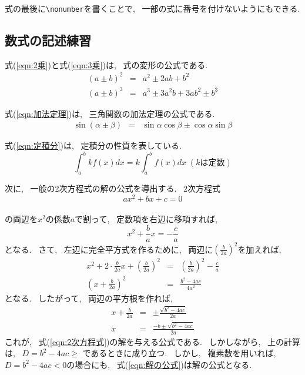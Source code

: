 \documentclass[titlepage]{jarticle}
\begin{document}
			式の最後に\verb|\nonumber|を書くことで, ~一部の式に番号を付けないようにもできる.

	\subsection{数式の記述練習}
		式(\ref{eqn:2乗})と式(\ref{eqn:3乗})は, ~式の変形の公式である.
		\begin{eqnarray}
			(a \pm b)^2 &=& a^2 \pm 2ab + b^2 \label{eqn:2乗} \\
			(a \pm b)^3 &=& a^3 \pm 3a^2b + 3ab^2 \pm b^3 \label{eqn:3乗}
		\end{eqnarray}

		式(\ref{eqn:加法定理})は, ~三角関数の加法定理の公式である.
		\begin{eqnarray}
			\sin(\alpha \pm \beta) &=& \sin{\alpha}\cos{\beta} \pm \cos{\alpha}\sin{\beta}\label{eqn:加法定理}
		\end{eqnarray}

		式(\ref{eqn:定積分})は, ~定積分の性質を表している.
		\begin{equation}
			\int_a^b kf(x)dx = k\int_a^b f(x)dx \;(kは定数)\label{eqn:定積分}
		\end{equation}

		次に, ~一般の2次方程式の解の公式を導出する. ~2次方程式
		\begin{equation}
			ax^2 + bx + c = 0 \label{eqn:2次方程式}
		\end{equation}
		\\
		の両辺を$x^2$の係数$a$で割って, ~定数項を右辺に移項すれば,
		$$
			x^2 + \frac{b}{a}x = - \frac{c}{a}
		$$
		となる. ~さて, ~左辺に完全平方式を作るために, ~両辺に$\displaystyle \left(\frac{b}{2a}\right)^2$を加えれば,
		\begin{eqnarray*}
			x^2 + 2 \cdot \frac{b}{2a}x + \left(\frac{b}{2a}\right)^2 &=& \left(\frac{b}{2a}\right)^2 - \frac{c}{a} \\
			\left(x + \frac{b}{2a}\right)^2 &=& \frac{b^2 - 4ac}{4a^2}
		\end{eqnarray*}
		となる. ~したがって, ~両辺の平方根を作れば,
		\begin{eqnarray}
			x + \frac{b}{2a} &=& \pm\frac{\sqrt{b^2 - 4ac}}{2a} \nonumber \\
			x &=& \frac{-b \pm \sqrt{b^2 - 4ac}}{2a} \label{eqn:解の公式}
		\end{eqnarray}
		これが, ~式(\ref{eqn:2次方程式})の解を与える公式である. ~しかしながら, ~上の計算は, ~$D = b^2 - 4ac \geq$
		であるときに成り立つ. ~しかし, ~複素数を用いれば, ~$D = b^2 - 4ac < 0$の場合にも,
		~式(\ref{eqn:解の公式})は解の公式となる.
\end{document}
